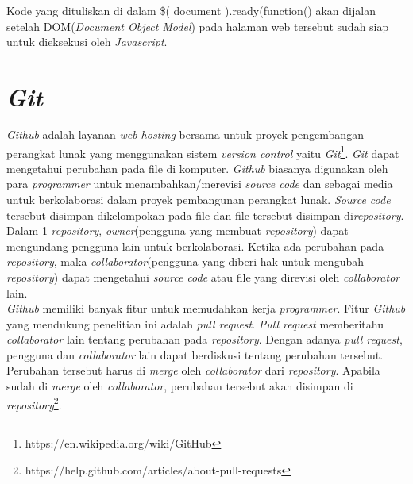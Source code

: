 Kode yang dituliskan di dalam \$( document ).ready(function() akan dijalan setelah DOM(\textit{Document Object Model}) pada halaman web tersebut sudah siap untuk dieksekusi oleh \textit{Javascript}. 

\section{\textit{Git}}
\label{sec:Git}
\textit{Github} adalah layanan \textit{web hosting} bersama untuk proyek pengembangan perangkat lunak yang menggunakan sistem \textit{version control} yaitu \textit{Git}\footnote{https://en.wikipedia.org/wiki/GitHub}. \textit{Git} dapat mengetahui perubahan pada file di komputer. \textit{Github} biasanya digunakan oleh para \textit{programmer} untuk menambahkan/merevisi \textit{source code} dan sebagai media untuk berkolaborasi dalam proyek pembangunan perangkat lunak. \textit{Source code} tersebut disimpan dikelompokan pada file dan file tersebut disimpan di\textit{repository}. Dalam 1 \textit{repository}, \textit{owner}(pengguna yang membuat \textit{repository}) dapat mengundang pengguna lain untuk berkolaborasi. Ketika ada perubahan pada \textit{repository}, maka \textit{collaborator}(pengguna yang diberi hak untuk mengubah \textit{repository}) dapat mengetahui \textit{source code} atau file yang direvisi oleh \textit{collaborator} lain.\\

\textit{Github} memiliki banyak fitur untuk memudahkan kerja \textit{programmer}. Fitur \textit{Github} yang mendukung penelitian ini adalah \textit{pull request}. \textit{Pull request} memberitahu \textit{collaborator} lain tentang perubahan pada \textit{repository}. Dengan adanya \textit{pull request}, pengguna dan \textit{collaborator} lain dapat berdiskusi tentang perubahan tersebut. Perubahan tersebut harus di \textit{merge} oleh \textit{collaborator} dari \textit{repository}. Apabila sudah di \textit{merge} oleh \textit{collaborator}, perubahan tersebut akan disimpan di \textit{repository}\footnote{https://help.github.com/articles/about-pull-requests}.
